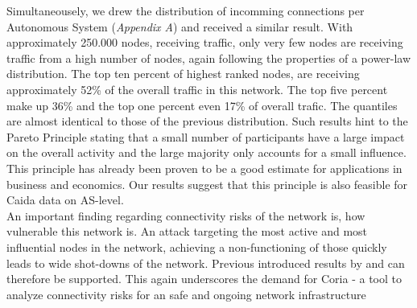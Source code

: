 \documentclass[conference, 11pt]{IEEEtran}
\begin{document}

Simultaneousely, we drew the distribution of incomming connections per Autonomous System (\textit{Appendix A}) and received a similar result. With approximately 250.000 nodes, receiving traffic, only very few nodes are receiving traffic from a high number of nodes, again following the properties of a power-law distribution. The top ten percent of highest ranked nodes, are receiving approximately 52\% of the overall traffic in this network. The top five percent make up 36\% and the top one percent even 17\% of overall trafic. The quantiles are almost identical to those of the previous distribution. Such results hint to the Pareto Principle stating that a small number of participants have a large impact on the overall activity and the large majority only accounts for a small influence. This principle has already been proven to be a good estimate for applications in business and economics. Our results suggest that this principle is also feasible for Caida data on AS-level.  \\ 



 


An important finding regarding connectivity risks of the network is, how vulnerable this network is. An attack targeting the most active and most influential nodes in the network, achieving a non-functioning of those quickly leads to wide shot-downs of the network. Previous introduced results by \cite{powerlawCitation} and \cite{owningInternet} can therefore be supported.  This again underscores the demand for Coria - a tool to analyze connectivity risks for an safe and ongoing network infrastructure 
\end{document}
